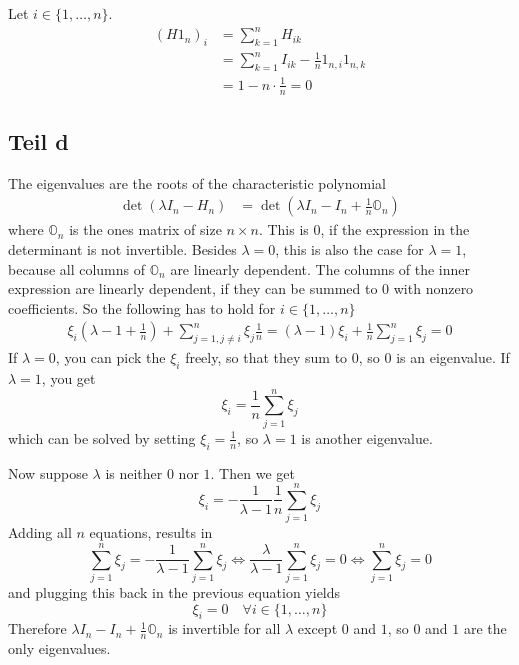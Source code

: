 \documentclass[10pt,a4paper]{article}
\begin{document}
Let $i \in \{ 1, \dots, n \}$.
\begin{align*}
  (H1_{n})_{i} & = \sum_{k = 1}^{n} H_{ik}\\
               & = \sum_{k = 1}^{n} I_{ik} - \frac{1}{n} 1_{n,i}1_{n,k}\\
               & = 1 - n \cdot \frac{1}{n} = 0
\end{align*}

\subsection{Teil d}

The eigenvalues are the roots of the characteristic polynomial
\begin{align*}
  \det(\lambda I_{n} - H_{n}) & = \det\left( \lambda I_{n} - I_{n} + \frac{1}{n}\mathbb{O}_{n} \right)
\end{align*}
where $\mathbb{O}_{n}$ is the ones matrix of size $n \times n$. This is $0$, if
the expression in the determinant is not invertible. Besides $\lambda = 0$, this
is also the case for $\lambda = 1$, because all columns of $\mathbb{O}_{n}$ are
linearly dependent. The columns of the inner expression are linearly dependent,
if they can be summed to $0$ with nonzero coefficients. So the following has to
hold for $i \in \{ 1, \dots, n \}$
\begin{align*}
  \xi_{i}\left( \lambda - 1 + \frac{1}{n} \right) + \sum_{j = 1, j \ne i}^{n} \xi_{j}\frac{1}{n} = (\lambda - 1)\xi_{i} + \frac{1}{n} \sum_{j = 1}^{n} \xi_{j} = 0
\end{align*}
If $\lambda = 0$, you can pick the $\xi_{i}$ freely, so that they sum to $0$, so
$0$ is an eigenvalue. If $\lambda = 1$, you get
\begin{equation*}
  \xi_{i} = \frac{1}{n} \sum_{j = 1}^{n} \xi_{j}
\end{equation*}
which can be solved by setting $\xi_{i} = \frac{1}{n}$, so $\lambda = 1$ is
another eigenvalue.

Now suppose $\lambda$ is neither $0$ nor $1$. Then we get
\begin{equation*}
  \xi_{i} = -\frac{1}{\lambda - 1}\frac{1}{n} \sum_{j = 1}^{n} \xi_{j}
\end{equation*}
Adding all $n$ equations, results in
\begin{equation*}
  \sum_{j = 1}^{n} \xi_{j} = -\frac{1}{\lambda - 1} \sum_{j = 1}^{n} \xi_{j} \Leftrightarrow \frac{\lambda}{\lambda - 1} \sum_{j = 1}^{n} \xi_{j} = 0 \Leftrightarrow \sum_{j = 1}^{n} \xi_{j} = 0
\end{equation*}
and plugging this back in the previous equation yields
\begin{equation}
  \xi_{i} = 0 \quad \forall i \in \{ 1, \dots, n \}
\end{equation}
Therefore $\lambda I_{n} - I_{n} + \frac{1}{n}\mathbb{O}_{n}$ is invertible for
all $\lambda$ except $0$ and $1$, so $0$ and $1$ are the only eigenvalues.
\end{document}
